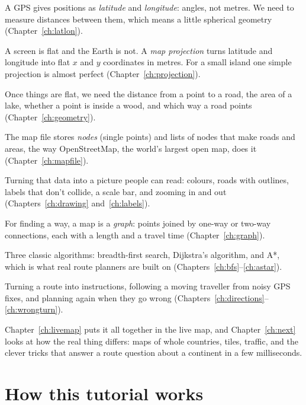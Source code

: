 \begin{description}[style=nextline, leftmargin=1.2em, itemsep=0.4em]
  \item[Positions on a round Earth.] A GPS gives positions as
    \emph{latitude} and \emph{longitude}: angles, not metres. We need to
    measure distances between them, which means a little spherical
    geometry (Chapter~\ref{ch:latlon}).
  \item[Flattening the Earth.] A screen is flat and the Earth is not.
    A \emph{map projection} turns latitude and longitude into flat
    $x$ and $y$ coordinates in metres. For a small island one simple
    projection is almost perfect (Chapter~\ref{ch:projection}).
  \item[Geometry.] Once things are flat, we need the distance from a point
    to a road, the area of a lake, whether a point is inside a wood, and
    which way a road points (Chapter~\ref{ch:geometry}).
  \item[The map as data.] The map file stores \emph{nodes} (single points)
    and lists of nodes that make roads and areas, the way OpenStreetMap,
    the world's largest open map, does it (Chapter~\ref{ch:mapfile}).
  \item[Drawing.] Turning that data into a picture people can read:
    colours, roads with outlines, labels that don't collide, a scale bar,
    and zooming in and out (Chapters~\ref{ch:drawing}
    and~\ref{ch:labels}).
  \item[Roads as a graph.] For finding a way, a map is a \emph{graph}:
    points joined by one-way or two-way connections, each with a length
    and a travel time (Chapter~\ref{ch:graph}).
  \item[Searching for a route.] Three classic algorithms: breadth-first
    search, Dijkstra's algorithm, and A*, which is what real route
    planners are built on (Chapters~\ref{ch:bfs}--\ref{ch:astar}).
  \item[Navigation.] Turning a route into instructions, following a
    moving traveller from noisy GPS fixes, and planning again when they go
    wrong (Chapters~\ref{ch:directions}--\ref{ch:wrongturn}).
\end{description}

Chapter~\ref{ch:livemap} puts it all together in the live map, and
Chapter~\ref{ch:next} looks at how the real thing differs: maps of whole
countries, tiles, traffic, and the clever tricks that answer a route
question about a continent in a few milliseconds.

\section{How this tutorial works}

